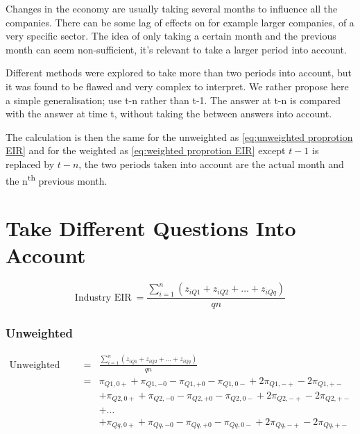 \documentclass[12pt,a4paper,oneside]{book}
\begin{document}
Changes in the economy are usually taking several months to influence all the companies. There can be some lag of effects on for example larger companies, of a very specific sector.
The idea of only taking a certain month and the previous month can seem non-sufficient, it's relevant to take a larger period into account. 

Different methods were explored to take more than two periods into account, but it was found to be flawed and very complex to interpret.
We rather propose here a simple generalisation; use t-n rather than t-1. 
The answer at t-n is compared with the answer at time t, without taking the between answers into account.

The calculation is then the same for the unweighted as \autoref{eq:unweighted proprotion EIR} and for the weighted as \autoref{eq:weighted proprotion EIR} except $t-1$ is replaced by $t-n$, the two periods taken into account are the actual month and the n\textsuperscript{th} previous month.


\section{Take Different Questions Into Account}


\begin{equation}
    \mbox{Industry EIR}\ = \frac{\sum_{i=1}^n \left(z_{i Q1} + z_{i Q2} + \ldots + z_{i Qq} \right)}{qn}
\end{equation}



\subsubsection{Unweighted}

\begin{eqnarray}
\mbox{Unweighted EIR}\ &=& \frac{\sum_{i=1}^n \left(z_{i Q1} + z_{i Q2} + \ldots + z_{i Qq} \right)}{qn} \nonumber \\
&=&    \pi_{Q1,0+} + \pi_{Q1,-0} - \pi_{Q1,+0} - \pi_{Q1,0-} +2 \pi_{Q1,-+} -2\pi_{Q1,+-} \nonumber \\
&&    + \pi_{Q2,0+} + \pi_{Q2,-0} - \pi_{Q2,+0} - \pi_{Q2,0-} +2 \pi_{Q2,-+} -2\pi_{Q2,+-} \nonumber \\
&&	 + \ldots \nonumber \\
&&   + \pi_{Qq,0+} + \pi_{Qq,-0} - \pi_{Qq,+0} - \pi_{Qq,0-} +2 \pi_{Qq,-+} -2\pi_{Qq,+-} \nonumber \\
\end{eqnarray}
\end{document}
